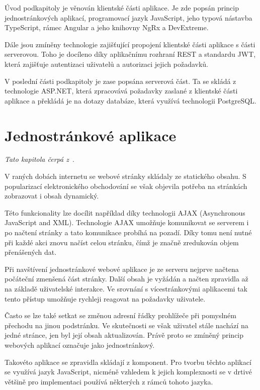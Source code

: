 Úvod podkapitoly je věnován klientské části aplikace. Je zde popsán princip jednostránkových aplikací, programovací jazyk JavaScript, jeho typová nástavba TypeScript, rámec Angular a jeho knihovny NgRx a DevExtreme.

Dále jsou zmíněny technologie zajišťující propojení klientské části aplikace s části serverovou. Toho je docíleno díky aplikačnímu rozhraní REST a standardu JWT, která zajišťuje autentizaci uživatelů a autorizaci jejich požadavků.

V poslední části podkapitoly je zase popsána serverová část. Ta se skládá z technologie ASP.NET, která zpracovává požadavky zaslané z klientské části aplikace a překládá je na dotazy databáze, která využívá technologii PostgreSQL.


\section{Jednostránkové aplikace}\label{sec:spa}

\emph{Tato kapitola čerpá z~\cite{bib:spa}}.

V raných dobách internetu se webové stránky skládaly ze statického obsahu. S popularizací elektronického obchodování se však objevila potřeba na stránkách zobrazovat i obsah dynamický. 

Této funkcionality lze docílit například díky technologii AJAX (Asynchronous JavaScript and XML). Technologie AJAX umožňuje komunikovat se serverem i po načtení stránky a tato komunikace probíhá na pozadí. Díky tomu není nutné při každé akci znovu načíst celou stránku, čímž je značně zredukován objem přenášených dat.

Při navštívení jednostránkové webové aplikace je ze serveru nejprve načtena počáteční zmenšená část stránky. Další obsah je vyžádán a načten zpravidla až na základě uživatelské interakce. Ve srovnání s vícestránkovými aplikacemi tak tento přístup umožňuje rychleji reagovat na požadavky uživatele.

Často se lze také setkat se změnou adresní řádky prohlížeče při pomyslném přechodu na jinou podstránku. Ve skutečnosti se však uživatel stále nachází na jedné stránce, jen byl její obsah aktualizován. Právě proto se zmíněný princip webových aplikací označuje jako jednostránkový.

Takovéto aplikace se zpravidla skládají z komponent. Pro tvorbu těchto aplikací se využívá jazyk JavaScript, nicméně vzhledem k jejich komplexnosti se v drtivé většině pro implementaci používá některých z rámců tohoto jazyka.



